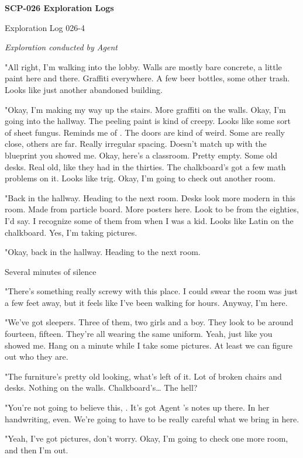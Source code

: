 \textbf{SCP-026 Exploration Logs}
\begin{flushleft}
Exploration Log 026-4
\end{flushleft}
\textsl{Exploration conducted by Agent }

"All right, I'm walking into the lobby. Walls are mostly bare concrete, a little paint here and there. Graffiti everywhere. A few beer bottles, some other trash. Looks like just another abandoned building.

"Okay, I'm making my way up the stairs. More graffiti on the walls. Okay, I'm going into the hallway. The peeling paint is kind of creepy. Looks like some sort of sheet fungus. Reminds me of \redacted. The doors are kind of weird. Some are really close, others are far. Really irregular spacing. Doesn't match up with the blueprint you showed me. Okay, here's a classroom. Pretty empty. Some old desks. Real old, like they had in the thirties. The chalkboard's got a few math problems on it. Looks like trig. Okay, I'm going to check out another room.

"Back in the hallway. Heading to the next room. Desks look more modern in this room. Made from particle board. More posters here. Look to be from the eighties, I'd say. I recognize some of them from when I was a kid. Looks like Latin on the chalkboard. Yes, I'm taking pictures.

"Okay, back in the hallway. Heading to the next room.

\lb Several minutes of silence\rb

"There's something really screwy with this place. I could swear the room was just a few feet away, but it feels like I've been walking for hours. Anyway, I'm here.

"We've got sleepers. Three of them, two girls and a boy. They look to be around fourteen, fifteen. They're all wearing the same uniform. Yeah, just like you showed me. Hang on a minute while I take some pictures. At least we can figure out who they are.

"The furniture's pretty old looking, what's left of it. Lot of broken chairs and desks. Nothing on the walls. Chalkboard's… The hell?

"You're not going to believe this, . It's got Agent 's notes up there. In her handwriting, even. We're going to have to be really careful what we bring in here.

"Yeah, I've got pictures, don't worry. Okay, I'm going to check one more room, and then I'm out.

